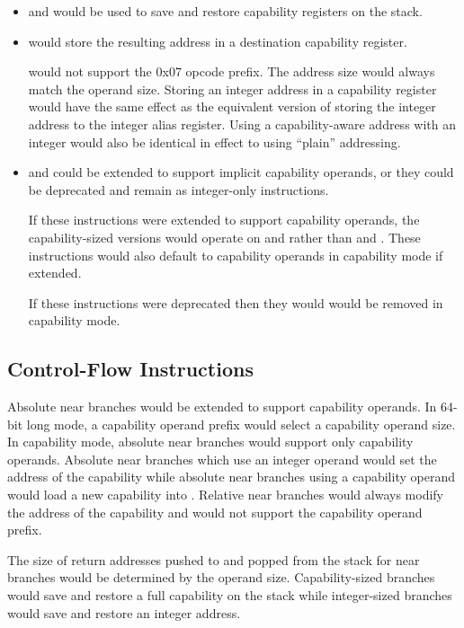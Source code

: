 \begin{itemize}
  \item {} and  would be used to save
    and restore capability registers on the stack.

  \item {} would store the resulting address in a
    destination capability register.

     would not support the 0x07 opcode prefix.  The
    address size would always match the operand size.  Storing an
    integer address in a capability register would have the same
    effect as the equivalent version of  storing the
    integer address to the integer alias register.  Using a
    capability-aware address with an integer  would
    also be identical in effect to using ``plain'' addressing.

  \item {} and  could be extended to
    support implicit capability operands, or they could be deprecated
    and remain as integer-only instructions.

    If these instructions were extended to support capability
    operands, the capability-sized versions would operate on \CSP{}
    and \CBP{} rather than \RSP{} and \RBP{}.  These instructions
    would also default to capability operands in capability mode
    if extended.

    If these instructions were deprecated then they would would be
    removed in capability mode.
\end{itemize}

\subsection{Control-Flow Instructions}

Absolute near branches would be extended to support capability operands.
In 64-bit long mode, a capability operand prefix would select a
capability operand size.  In capability mode, absolute near branches would
support only capability operands.
Absolute near branches which use an integer operand would set the address of the
\CIP{} capability while absolute near branches using a capability operand would
load a new capability into \CIP{}.
Relative near branches would always modify the address of the \CIP{}
capability and would not support the capability operand prefix.

The size of return addresses pushed to and popped from the
stack for near branches would be determined by the operand size.
Capability-sized branches would save and restore a full capability on
the stack while integer-sized branches would save and restore an
integer address.

